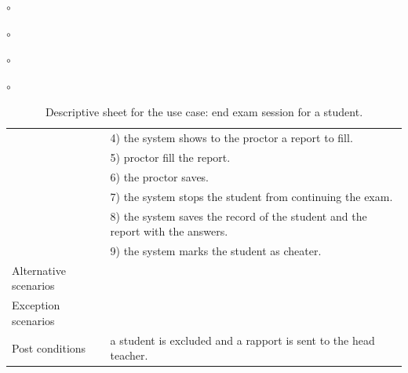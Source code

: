 \documentclass[]{uc2pfecaneva}
\begin{document}
\begin{list}{$\circ$}{}
\begin{list}{$\circ$}{}
\begin{list}{$\circ$}{}
\begin{list}{$\circ$}{}
\begin{table}[h]
\begin{tabularx}{\textwidth}{|l|X|}
            & 4) the system shows to the proctor a report to fill.                                                                   \\
            & 5) proctor fill the report.                                                                                            \\
            & 6) the proctor saves.                                                                                                  \\
            & 7) the system stops the student from continuing the exam.                                                              \\
            & 8) the system saves the record of the student and the report with the answers.                                         \\
            & 9) the system marks the student as cheater.                                                                            \\ \hline
            Alternative scenarios
            \\ \hline
            Exception scenarios
            \\ \hline
            Post conditions
            & a student is excluded and a rapport is sent to the head teacher.                                                       \\ \hline
        \end{tabularx}
        \caption{Descriptive sheet for the use case: end exam session for a student.}
        \label{table:5}
    \end{table}
    \clearpage


    \begin{figure}[h]

\end{figure}
\end{list}
\end{list}
\end{list}
\end{list}
\end{document}
